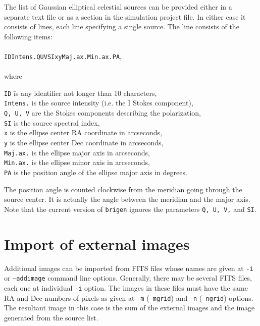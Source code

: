 \documentclass[letterpaper, oneside, 11pt]{article}
\begin{document}
The list of Gaussian elliptical celestial sources can be provided either in a separate text file or as a section in the simulation project file. In either case it consists of lines, each line specifying a single source. The line consists of the following items:\\\\
{\tt ID\quad Intens.\quad Q\quad U\quad V\quad SI\quad x\quad y\quad Maj.ax.\quad Min.ax.\quad PA},\\\\
where
\begin{tabbing}
{\tt ID} \hspace{10mm} \= is any identifier not longer than 10 characters, \\
{\tt Intens.} \>is the source intensity (i.e. the I Stokes component), \\
{\tt Q, U, V} \>are the Stokes components describing the polarization, \\
{\tt SI} \>is the source spectral index, \\
{\tt x} \>is the ellipse center RA coordinate in arcseconds, \\
{\tt y} \>is the ellipse center Dec coordinate in arcseconds, \\
{\tt Maj.ax.} \>is the ellipse major axis in arcseconds, \\
{\tt Min.ax.} \>is the ellipse minor axis in arcseconds, \\
{\tt PA} \>is the position angle of the ellipse major axis in degrees. \\
\end{tabbing}
The position angle is counted clockwise from the meridian going through the source center. It is actually the angle between the meridian and the major axis.\\

Note that the current version of {\tt brigen} ignores the parameters {\tt Q, U, V,} and {\tt SI}.

\section{Import of external images}

Additional images can be imported from FITS files whose names are given at {\tt -i} or {\tt --addimage} command line options. Generally, there may be several FITS files, each one at individual {\tt -i} option. The images in these files must have the same RA and Dec numbers of pixels as given at {\tt -m} ({\tt --mgrid}) and {\tt -n} ({\tt --ngrid}) options. The resultant image in this case is the sum of the external images and the image generated from the source list.\\ 
\end{document}
